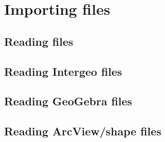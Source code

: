 \chapter{Importing files}\label{ch:import}

\section{Reading \geonext{} files}\label{sec:geonext}
\section{Reading Intergeo files}\label{sec:intergeo}
\section{Reading GeoGebra files}\label{sec:geogebra}
\section{Reading ArcView/shape files}\label{sec:arcview}